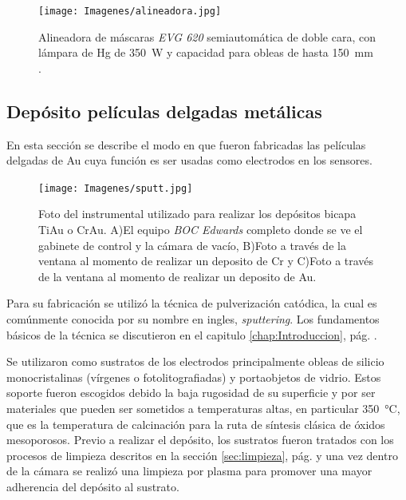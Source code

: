 			\begin{figure}[ht]
			  \begin{center}
			  \texttt{[image: Imagenes/alineadora.jpg]}
			  \caption[Alineadora de máscaras]{Alineadora de máscaras \textit{EVG 620} semiautomática de doble cara, con lámpara de Hg de \SI{350}{W}  y capacidad para obleas de hasta \SI{150}{\mm} .}
			  \label{fig:alineadora}
			  \end{center}
			  \end{figure}	

	\subsection{Depósito películas delgadas metálicas}\label{sec:sputt}

			En esta sección se describe el modo en que fueron fabricadas las películas delgadas de Au cuya función es ser usadas como electrodos en los sensores. 
				  \begin{figure}[t!]
				  \begin{center}
				  \texttt{[image: Imagenes/sputt.jpg]}
				  \caption[Equipo para depósito de películas delgadas, \textit{sputtering}]{Foto del instrumental utilizado para realizar los depósitos bicapa Ti\textbar Au o Cr\textbar Au. A)El equipo \textit{BOC Edwards} completo donde se ve el gabinete de control y la cámara de vacío, B)Foto a través de la ventana al momento de realizar un deposito de Cr y C)Foto a través de la ventana al momento de realizar un deposito de Au.}
				  \label{fig:sputt}
				  \end{center}
				  \end{figure}	
			
			Para su fabricación se utilizó la técnica de pulverización catódica, la cual es comúnmente conocida por su nombre en ingles, \textit{sputtering}\cite{sigmund1968}. Los fundamentos básicos de la técnica se discutieron en el capitulo \ref{chap:Introduccion}, pág. \pageref{sec:microfabricacion}.

			Se utilizaron como sustratos de los electrodos principalmente obleas de silicio monocristalinas (vírgenes o fotolitografiadas) y portaobjetos de vidrio.  Estos soporte fueron escogidos debido la baja rugosidad de su superficie y por ser materiales que pueden ser sometidos a temperaturas altas, en particular \SI{350}{\celsius}, que es la temperatura de calcinación para la ruta de síntesis clásica de óxidos mesoporosos. Previo a realizar el depósito, los sustratos fueron tratados con los procesos de limpieza descritos en la sección \ref{sec:limpieza}, pág. \pageref{sec:limpieza} y una vez dentro de la cámara se realizó una limpieza por plasma para promover una mayor adherencia del depósito al sustrato.

